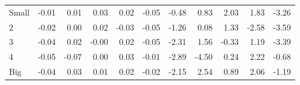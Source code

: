 \begin{table}[!ht]
\begin{tabular}{lrrrrrrrrrr}
    \\
      \cmidrule(r){2-6} \cmidrule(r){7-11}

    Small   & -0.01  & 0.01  & 0.03  & 0.02  & -0.05  & -0.48  & 0.83  & 2.03  & 1.83  & -3.26  \\
         2  & -0.02  & 0.00  & 0.02  & -0.03  & -0.05  & -1.26  & 0.08  & 1.33  & -2.58  & -3.59  \\
         3  & -0.04  & 0.02  & -0.00  & 0.02  & -0.05  & -2.31  & 1.56  & -0.33  & 1.19  & -3.39  \\
         4  & -0.05  & -0.07  & 0.00  & 0.03  & -0.01  & -2.89  & -4.50  & 0.24  & 2.22  & -0.68  \\
    Big     & -0.04  & 0.03  & 0.01  & 0.02  & -0.02  & -2.15  & 2.54  & 0.89  & 2.06  & -1.19  \\

  

  \bottomrule
\end{tabular}
\label{tbl:25_Size_Inv_C97}
\end{table}